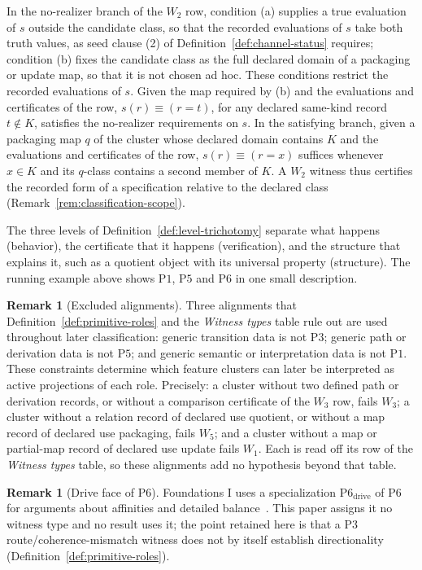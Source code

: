 \documentclass[11pt]{article}
\theoremstyle{definition}
\newtheorem{remark}[theorem]{Remark}
\newcommand{\Pone}{\ensuremath{\mathrm{P1}}}
\newcommand{\Pthree}{\ensuremath{\mathrm{P3}}}
\newcommand{\Pfive}{\ensuremath{\mathrm{P5}}}
\newcommand{\Psix}{\ensuremath{\mathrm{P6}}}
\begin{document}
In the no-realizer branch of the \(W_2\) row, condition (a) supplies a true
evaluation of \(s\) outside the candidate class, so that the recorded
evaluations of \(s\) take both truth values, as seed clause (2) of
Definition~\ref{def:channel-status} requires; condition (b) fixes the candidate
class as the full declared domain of a packaging or update map, so that it is
not chosen ad hoc. These conditions restrict the recorded evaluations of \(s\).
Given the map required by (b) and the evaluations and certificates of the row, \(s(r)\equiv(r=t)\), for any
declared same-kind record \(t\notin K\), satisfies the no-realizer
requirements on \(s\). In the satisfying branch, given a packaging map \(q\) of the cluster whose declared domain contains \(K\) and the evaluations and certificates of the row, \(s(r)\equiv(r=x)\)
suffices whenever \(x\in K\) and its \(q\)-class contains a
second member of \(K\). A \(W_2\) witness thus certifies the recorded form of a
specification relative to the declared class
(Remark~\ref{rem:classification-scope}).

The three levels of Definition~\ref{def:level-trichotomy} separate what
happens (behavior), the certificate that it happens (verification), and
the structure that explains it, such as a quotient object with its
universal property (structure). The running example above shows \Pone{}, \Pfive{} and \Psix{}
in one small description.

\begin{remark}[Excluded alignments]\label{rem:repaired-alignments}
Three alignments that Definition~\ref{def:primitive-roles} and the
\emph{Witness types} table rule out
are used throughout later classification: generic transition data is
not \Pthree{}; generic path or derivation data is not \Pfive{}; and
generic semantic or interpretation data is not \Pone{}. These
constraints determine which feature clusters can later be interpreted
as active projections of each role. Precisely: a cluster without two defined
path or derivation records, or without a comparison certificate of the
\(W_3\) row, fails \(W_3\); a cluster without a relation record of declared use quotient,
or without a map record of declared use packaging, fails \(W_5\); and a cluster without
a map or partial-map record of declared use update fails \(W_1\). Each is read
off its row of the \emph{Witness types} table, so these alignments add no
hypothesis beyond that table.
\end{remark}

\begin{remark}[Drive face of \Psix{}]\label{rem:p6-drive}
Foundations I uses a specialization \(\mathrm{P6}_{\mathrm{drive}}\) of
\Psix{} for arguments about affinities and detailed
balance~\citep{Seifert2012}. This paper assigns it no witness type and no
result uses it; the point retained here is that a \Pthree{}
route/coherence-mismatch witness does not by itself establish directionality
(Definition~\ref{def:primitive-roles}).
\end{remark}
\end{document}

